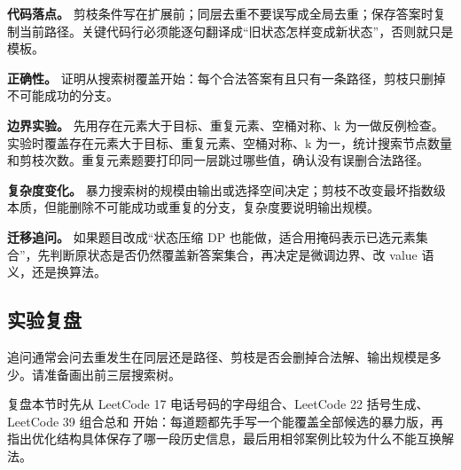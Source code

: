 \textbf{代码落点。} 剪枝条件写在扩展前；同层去重不要误写成全局去重；保存答案时复制当前路径。关键代码行必须能逐句翻译成“旧状态怎样变成新状态”，否则就只是模板。

\textbf{正确性。} 证明从搜索树覆盖开始：每个合法答案有且只有一条路径，剪枝只删掉不可能成功的分支。

\textbf{边界实验。} 先用存在元素大于目标、重复元素、空桶对称、k 为一做反例检查。实验时覆盖存在元素大于目标、重复元素、空桶对称、k 为一，统计搜索节点数量和剪枝次数。重复元素题要打印同一层跳过哪些值，确认没有误删合法路径。

\textbf{复杂度变化。} 暴力搜索树的规模由输出或选择空间决定；剪枝不改变最坏指数级本质，但能删除不可能成功或重复的分支，复杂度要说明输出规模。

\textbf{迁移追问。} 如果题目改成“状态压缩 DP 也能做，适合用掩码表示已选元素集合”，先判断原状态是否仍然覆盖新答案集合，再决定是微调边界、改 value 语义，还是换算法。

\subsection{实验复盘}

追问通常会问去重发生在同层还是路径、剪枝是否会删掉合法解、输出规模是多少。请准备画出前三层搜索树。

复盘本节时先从 LeetCode 17 电话号码的字母组合、LeetCode 22 括号生成、LeetCode 39 组合总和 开始：每道题都先手写一个能覆盖全部候选的暴力版，再指出优化结构具体保存了哪一段历史信息，最后用相邻案例比较为什么不能互换解法。
